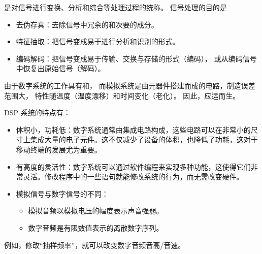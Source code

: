 \begin{definition}[信号处理]
    是对信号进行变换、分析和综合等处理过程的统称。
    信号处理的目的是
    \begin{itemize}
        \item 去伪存真：去除信号中冗余的和次要的成分。
        \item 特征抽取：把信号变成易于进行分析和识别的形式。
        \item 编码解码：把信号变成易于传输、交换与存储的形式（编码），
            或从编码信号中恢复出原始信号（解码）。
    \end{itemize}
\end{definition}

\begin{example}
    由于数字系统的工作具有和，
    而模拟系统是由元器件搭建而成的电路，制造误差范围大，
    特性随温度（温度漂移）和时间变化（老化）。
    因此，应运而生。

    DSP 系统的特点有：
    \begin{itemize}
        \item 体积小，功耗低：数字系统通常由集成电路构成，这些电路可以在非常小的尺寸上集成大量的电子元件。这不仅减少了设备的体积，也降低了功耗，这对于移动终端的发展尤为重要。
        \item 有高度的灵活性：数字系统可以通过软件编程来实现多种功能，这使得它们非常灵活。修改程序中的一些语句就能修改系统的行为，而无需改变硬件。
        \item 模拟信号与数字信号的不同：
            \begin{itemize}
                \item 模拟音频以模拟电压的幅度表示声音强弱。
                \item 数字音频是有限数值表示的离散数字序列。
            \end{itemize}
    \end{itemize}
    例如，修改``抽样频率''，就可以改变数字音频音高/音速。
\end{example}
